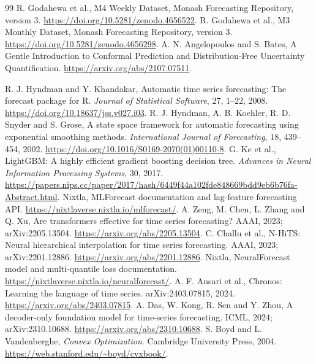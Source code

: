 \documentclass[11pt,a4paper]{article}
\begin{document}
\begin{thebibliography}{99}
 R. Godahewa et al., M4 Weekly Dataset, Monash Forecasting Repository, version 3. \url{https://doi.org/10.5281/zenodo.4656522}.
 R. Godahewa et al., M3 Monthly Dataset, Monash Forecasting Repository, version 3. \url{https://doi.org/10.5281/zenodo.4656298}.
 A. N. Angelopoulos and S. Bates, A Gentle Introduction to Conformal Prediction and Distribution-Free Uncertainty Quantification. \url{https://arxiv.org/abs/2107.07511}.

 R. J. Hyndman and Y. Khandakar, Automatic time series forecasting: The forecast package for R. \emph{Journal of Statistical Software}, 27, 1--22, 2008. \url{https://doi.org/10.18637/jss.v027.i03}.
 R. J. Hyndman, A. B. Koehler, R. D. Snyder and S. Grose, A state space framework for automatic forecasting using exponential smoothing methods. \emph{International Journal of Forecasting}, 18, 439--454, 2002. \url{https://doi.org/10.1016/S0169-2070(01)00110-8}.
 G. Ke et al., LightGBM: A highly efficient gradient boosting decision tree. \emph{Advances in Neural Information Processing Systems}, 30, 2017. \url{https://papers.nips.cc/paper/2017/hash/6449f44a102fde848669bdd9eb6b76fa-Abstract.html}.
 Nixtla, MLForecast documentation and lag-feature forecasting API. \url{https://nixtlaverse.nixtla.io/mlforecast/}.
 A. Zeng, M. Chen, L. Zhang and Q. Xu, Are transformers effective for time series forecasting? AAAI, 2023; arXiv:2205.13504. \url{https://arxiv.org/abs/2205.13504}.
 C. Challu et al., N-HiTS: Neural hierarchical interpolation for time series forecasting. AAAI, 2023; arXiv:2201.12886. \url{https://arxiv.org/abs/2201.12886}.
 Nixtla, NeuralForecast model and multi-quantile loss documentation. \url{https://nixtlaverse.nixtla.io/neuralforecast/}.
 A. F. Ansari et al., Chronos: Learning the language of time series. arXiv:2403.07815, 2024. \url{https://arxiv.org/abs/2403.07815}.
 A. Das, W. Kong, R. Sen and Y. Zhou, A decoder-only foundation model for time-series forecasting. ICML, 2024; arXiv:2310.10688. \url{https://arxiv.org/abs/2310.10688}.
 S. Boyd and L. Vandenberghe, \emph{Convex Optimization}. Cambridge University Press, 2004. \url{https://web.stanford.edu/~boyd/cvxbook/}.
\end{thebibliography}
\endgroup
\end{document}
